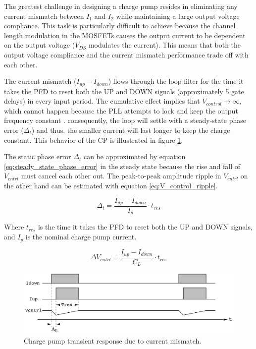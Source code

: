 \noindent The greatest challenge in designing a charge pump resides in eliminating any current mismatch between $I_1$ and $I_2$ while maintaining a
large output voltage compliance. This task is particularly difficult to achieve because the channel length modulation in the MOSFETs
causes the output current to be dependent on the output voltage ($V_{DS}$ modulates the current). This means that both the output voltage
compliance and the current mismatch performance trade off with each other.

The current mismatch ($I_{up} - I_{down}$) flows through the loop filter for the time it takes the PFD to reset both the UP and DOWN signals (approximately 5 gate delays) in every
input period. The cumulative effect implies that $V_{control} \to \infty $, which cannot happen because the PLL attempts to lock and keep the output frequency constant
\cite{bib:Razavi_PLL_book}. consequently, the loop will settle with a steady-state phase error ($\Delta_t$) and thus, the smaller current will last longer to keep the charge
constant. This behavior of the CP is illustrated in figure \ref{fig:CP_transient_response}.

\noindent The static phase error $\Delta_t$ can be approximated by equation \eqref{eq:steady_state_phase_error} in the steady state because the rise and fall of $V_{cntrl}$ must cancel each 
other out. The peak-to-peak amplitude ripple in $V_{cntrl}$ on the other hand can be estimated with equation \eqref{eq:V_control_ripple}.

\pagebreak

\begin{equation}
    \Delta_t = \frac{I_{up} - I_{down}}{I_{p}} \cdot t_{res}
    \label{eq:steady_state_phase_error}
\end{equation}

\noindent Where $t_{res}$ is the time it takes the PFD to reset both the UP and DOWN signals, and $I_{p}$ is the nominal charge pump current.

\begin{equation}
    \Delta V_{cntrl} = \frac{I_{up} - I_{down}}{C_L} \cdot t_{res}
    \label{eq:V_control_ripple}
\end{equation}

\begin{figure}[H]
    \centering
    \includegraphics[width=1\textwidth]{figures/CP_transient_response.png}
    \caption{Charge pump transient response due to current mismatch.}
    \label{fig:CP_transient_response}
\end{figure}

